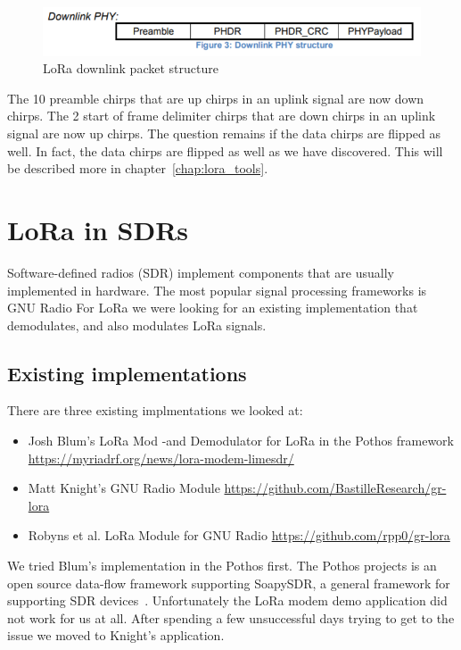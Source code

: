 \begin{figure}[h]
    \centering
    \includegraphics[width=1\textwidth]{figures/downlink_struct.png}
    \caption{LoRa downlink packet structure~\cite{lora_wan_spec}}
    \label{fig:downlink_struct}
\end{figure}

The 10 preamble chirps that are up chirps in an uplink signal are now down chirps.
The 2 start of frame delimiter chirps that are down chirps in an  uplink signal are now up chirps.
The question remains if the data chirps are flipped as well. In fact, the data chirps are flipped as well 
as we have discovered. This will be described more in chapter~\ref{chap:lora_tools}.


\chapter{LoRa in SDRs}
Software-defined radios (SDR) implement components that are usually implemented in hardware.
The most popular signal processing frameworks is GNU Radio
For LoRa we were looking for an existing implementation that demodulates, and also modulates LoRa signals.

\section{Existing implementations}
There are three existing implmentations we looked at:
\begin{itemize}
    \item Josh Blum's LoRa Mod -and Demodulator for LoRa in the Pothos framework \url{https://myriadrf.org/news/lora-modem-limesdr/}
    \item Matt Knight's GNU Radio Module \url{https://github.com/BastilleResearch/gr-lora}
    \item Robyns et al. LoRa Module for GNU Radio \url{https://github.com/rpp0/gr-lora}
\end{itemize}

We tried Blum's implementation in the Pothos  first. The Pothos projects is an open source data-flow framework
supporting SoapySDR, a general framework for supporting SDR devices~\cite{pothos}.
Unfortunately the LoRa modem demo application did not work for us at all. After spending a few unsuccessful days 
trying to get to the issue we moved to Knight's application.


